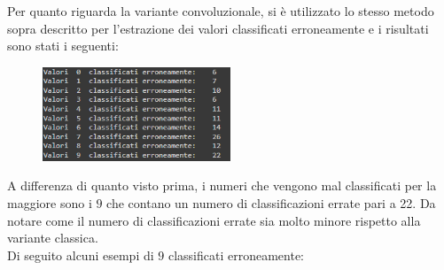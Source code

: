 \documentclass[12pt, a4paper]{article}
\begin{document}
Per quanto riguarda la variante convoluzionale, si è utilizzato lo stesso metodo sopra descritto per l'estrazione dei valori classificati erroneamente e i risultati sono stati i seguenti:
\begin{figure}[H]
    \centering
    \includegraphics[width=0.50\textwidth]{ErrateConv.png}
\end{figure}
A differenza di quanto visto prima, i numeri che vengono mal classificati per la maggiore sono i \(9\) che contano un numero di classificazioni errate pari a 22. Da notare come il numero di classificazioni errate sia molto minore rispetto alla variante classica.\\
Di seguito alcuni esempi di \(9\) classificati erroneamente:
\end{document}
